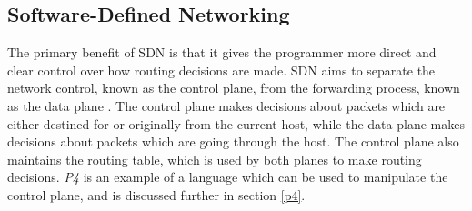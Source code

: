 \subsection{Software-Defined Networking}
\label{software_defined_networking}



The primary benefit of SDN is that it gives the programmer more direct and clear control over how routing decisions are made. SDN aims to separate the network control, known as the control plane, from the forwarding process, known as the data plane \cite{software_defined_networking_survey}. The control plane makes decisions about packets which are either destined for or originally from the current host, while the data plane makes decisions about packets which are going through the host. The control plane also maintains the routing table, which is used by both planes to make routing decisions. \textit{P4} is an example of a language which can be used to manipulate the control plane, and is discussed further in section \ref{p4}.
